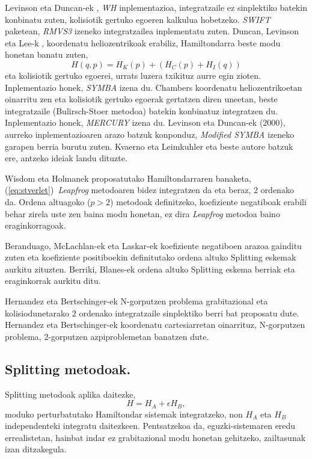 Levinson eta Duncan-ek \cite[1994]{Levison1994}, \emph{WH} inplementazioa, integratzaile ez sinplektiko batekin konbinatu zuten, kolisiotik gertuko egoeren kalkulua hobetzeko. \emph{SWIFT} paketean, \emph{RMVS3} izeneko integratzailea inplementatu zuten. Duncan, Levinson eta Lee-k \cite[1998]{Duncan1998}, koordenatu heliozentrikoak erabiliz, Hamiltondarra beste modu honetan banatu zuten,  
\begin{equation*}
H(q,p)=H_K(p)+(H_C(p)+H_I(q))
\end{equation*}
eta kolisiotik gertuko egoerei, urrats luzera txikituz aurre egin zioten. Inplementazio honek, \emph{SYMBA} izena du. Chambers \cite{Chambers1999} koordenatu heliozentrikoetan oinarritu zen eta kolisiotik gertuko egoerak gertatzen diren uneetan, beste integratzaile  (Bulirsch-Stoer metodoa) batekin konbinatuz integratzen du. Inplementazio honek, \emph{MERCURY} izena du. Levinson eta Duncan-ek ($2000$), aurreko inplementazioaren arazo batzuk konponduz, \emph{Modified SYMBA} izeneko garapen berria burutu zuten.
Kvaerno eta Leimkuhler \cite{Kvaerno2000} eta beste autore batzuk ere, antzeko ideiak landu dituzte.

Wisdom eta Holmanek proposatutako Hamiltondarraren banaketa, (\ref{eq:stverlet})~\emph{Leapfrog} metodoaren bidez integratzen da eta beraz, 2 ordenako da. Ordena altuagoko ($p>2$) metodoak definitzeko, koefiziente negatiboak erabili behar zirela uste zen \cite{Yoshida1993,Laskar2001} baina modu honetan, ez dira \emph{Leapfrog} metodoa baino eraginkorragoak.

Beranduago, McLachlan-ek \cite[1995]{McLachlan1995} eta Laskar-ek  \cite[2001]{Laskar2001} koefiziente negatiboen arazoa gainditu zuten eta koefiziente positiboekin definitutako ordena altuko Splitting eskemak aurkitu zituzten. Berriki, Blanes-ek \cite[2012]{Blanes2013} ordena altuko Splitting eskema berriak eta eraginkorrak aurkitu ditu. 

Hernandez eta Bertschinger-ek \cite[2015]{Hernandez2015} N-gorputzen problema grabitazional eta kolisiodunetarako $2$ ordenako integratzaile sinplektiko berri bat proposatu dute. Hernandez eta Bertschinger-ek \cite{Hernandez2015} koordenatu cartesiarretan oinarrituz, N-gorputzen problema, 2-gorputzen azpiproblemetan banatzen dute.


\subsection*{Splitting metodoak.}

Splitting metodoak aplika daitezke, 
\begin{equation}
\label{eq:Hban}
H=H_A+\epsilon H_B,
\end{equation}
moduko perturbatutako Hamiltondar sistemak integratzeko, non $H_A$ eta $H_B$ independenteki integratu daitezkeen. Pentsatzekoa da, eguzki-sistemaren eredu errealistetan, hainbat indar ez grabitazional modu honetan gehitzeko, zailtasunak izan ditzakegula.  

